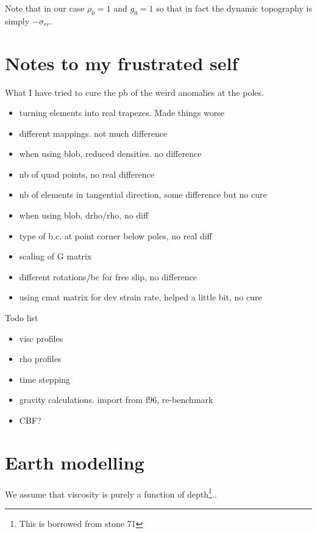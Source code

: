 Note that in our case $\rho_0=1$ and $g_0=1$ so that in fact the dynamic topography 
is simply $-\sigma_{rr}$.



\newpage
\section*{Notes to my frustrated self}

What I have tried to cure the pb of the weird anomalies at the poles.

\begin{itemize}
\item turning elements into real trapezes. Made things worse
\item different mappings. not much difference
\item when using blob, reduced densities. no difference
\item nb of quad points, no real difference
\item nb of elements in tangential direction, some difference but no cure
\item when using blob, drho/rho, no diff
\item type of b.c. at point corner below poles, no real diff
\item scaling of G matrix
\item different rotations/bc for free slip, no difference
\item using cmat matrix for dev strain rate, helped a little bit, no cure
\end{itemize}

Todo list

\begin{itemize}
\item visc profiles
\item rho profiles
\item time stepping
\item gravity calculations. import from f96, re-benchmark
\item CBF?
\end{itemize}


\newpage
\section*{Earth modelling}



We assume that viscosity is purely a function of depth\footnote{This is borrowed 
from stone 71}.. 

